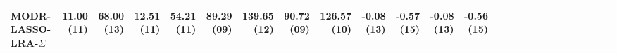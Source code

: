\begin{tabular}{lrrrrrrrrrrrrrrrrrrrrrrrr}
MODR-LASSO-LRA-$\Sigma$ & {\cellcolor[HTML]{C5DFEC}} \color[HTML]{000000} 11.00 (11) & {\cellcolor[HTML]{E17860}} \color[HTML]{F1F1F1} 68.00 (13) & {\cellcolor[HTML]{D7E8F1}} \color[HTML]{000000} 12.51 (11) & {\cellcolor[HTML]{DD7059}} \color[HTML]{F1F1F1} 54.21 (11) & {\cellcolor[HTML]{FCD3BC}} \color[HTML]{000000} 89.29 (09) & {\cellcolor[HTML]{FAEAE1}} \color[HTML]{000000} 139.65 (12) & {\cellcolor[HTML]{FBD0B9}} \color[HTML]{000000} 90.72 (09) & {\cellcolor[HTML]{F9F0EB}} \color[HTML]{000000} 126.57 (10) & {\cellcolor[HTML]{2A71B2}} \color[HTML]{F1F1F1} -0.08 (13) & {\cellcolor[HTML]{EF9979}} \color[HTML]{000000} -0.57 (15) & {\cellcolor[HTML]{2B73B3}} \color[HTML]{F1F1F1} -0.08 (13) & {\cellcolor[HTML]{FCD7C2}} \color[HTML]{000000} -0.56 (15) \\
\bottomrule
\end{tabular}
